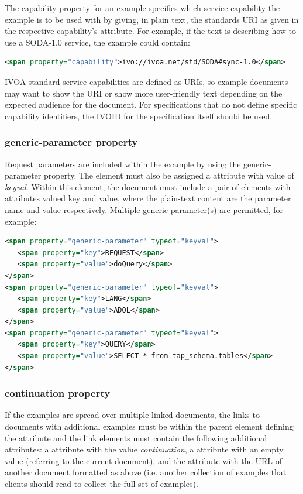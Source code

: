 \documentclass[11pt,letter]{ivoa}
\begin{document}
The capability property for an example specifies which service capability the 
example is to be used with by giving, in plain text, the standards URI
as given in the respective capability's  attribute. 
For example, if the text is describing how to use a
SODA-1.0 service, the example could contain:

\begin{lstlisting}[language=XML]
<span property="capability">ivo://ivoa.net/std/SODA#sync-1.0</span>
\end{lstlisting}

IVOA standard service capabilities are defined as URIs,  so example documents 
may want to show the URI or show more user-friendly text depending on the 
expected audience for the document. For specifications that do not define 
specific capability identifiers, the IVOID for the specification itself should 
be used.

\subsubsection{generic-parameter property}

Request parameters are included within the example by using the 
generic-parameter property. The element must also be assigned a
 attribute 
with value of \emph{keyval}. Within this element, the document must include a pair of 
elements with  attributes valued key and value, where the plain-text content are 
the parameter name and value respectively. Multiple generic-parameter(s) are 
permitted, for example:

\begin{lstlisting}[language=XML]
<span property="generic-parameter" typeof="keyval">
   <span property="key">REQUEST</span>
   <span property="value">doQuery</span>
</span>
<span property="generic-parameter" typeof="keyval">
   <span property="key">LANG</span>
   <span property="value">ADQL</span>
</span>
<span property="generic-parameter" typeof="keyval">
   <span property="key">QUERY</span>
   <span property="value">SELECT * from tap_schema.tables</span>
</span>
\end{lstlisting}

\subsubsection{continuation property}

If the examples are spread over multiple linked documents, the links to 
documents with additional examples must be within the parent element defining 
the  attribute and the link elements must contain the following additional 
attributes:  a  attribute with the value
\emph{continuation}, a 
attribute with an empty value (referring to the current document), and
the 
attribute with the URL of another document formatted as above (i.e. another 
collection of examples that clients should read to collect the full set of 
examples).
\end{document}
